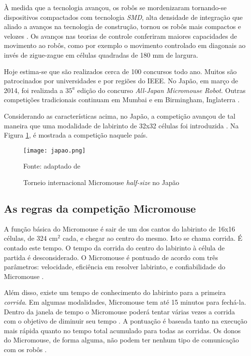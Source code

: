 À medida que a tecnologia avançou, os robôs se mordenizaram tornando-se dispositivos compactados com tecnologia \emph{SMD}, alta densidade de integração que aliado a avanços na tecnologia de construção, tornou os robôs mais compactos e velozes \cite{Christian:2014}. Os avanços nas teorias de controle conferiram maiores capacidades de movimento ao robôs, como por exemplo o movimento controlado em diagonais ao invés de zigue-zague em células quadradas de 180 mm de largura.

Hoje estima-se que são realizados cerca de 100 concursos todo ano. Muitos são patrocinados por universidades e por regiões do IEEE. No Japão, em março de 2014, foi realizada a $35^a$ edição do concurso \emph{All-Japan Micromouse Robot}. Outras competições tradicionais continuam em Mumbai e em Birmingham, Inglaterra \cite{Christian:2014}.


Considerando as características acima, no Japão, a competição avançou de tal maneira que uma modalidade de labirinto de 32x32 células foi introduzida \cite{6734188}. Na Figura {\ref{fig:japao}}, é mostrada a competição naquele país.


\begin{figure}[!htb]
	\caption{\label{fig:japao}Torneio internacional Micromouse \textit{half-size} no Japão}
	\begin{center}
		\texttt{[image: japao.png]}
	\end{center}
	\centering
	\small Fonte: adaptado de 
\end{figure}

\subsection{As regras da competição Micromouse}
A função básica do Micromouse é sair de um dos cantos do labirinto de 16x16 células, de 324 cm$^2$ cada, e chegar ao centro do mesmo. Isto se chama corrida. É contado este tempo. O tempo da corrida do centro do labirinto à célula de partida é desconsiderado. O Micromouse é pontuado de acordo com três parâmetros: velocidade, eficiência em resolver labirinto, e confiabilidade do Micromouse \cite{5658360}.

Além disso, existe um tempo de conhecimento do labirinto para a primeira \emph{corrida}. Em algumas modalidades, Micromouse tem até 15 minutos para fechá-la. Dentro da janela de tempo o Micromouse poderá tentar várias vezes a corrida com o objetivo de diminuir seu tempo \cite{5658360}. A pontuação é baseada tanto na execução mais rápida quanto no tempo total acumulado para todas as corridas. Os donos do Micromouse, de forma alguma, não podem ter nenhum tipo de comunicação com os robôs \cite{Christian:2014}.

